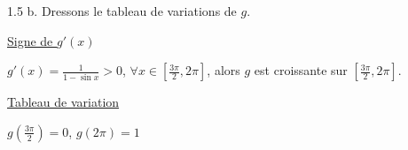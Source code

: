 \documentclass[12pt]{article}
\begin{document}
\begin{spacing}{1.5}
b. Dressons le tableau de variations de $g$.

\underline{Signe de $g'(x)$}

$g'(x)=\frac{1}{1-\sin x}>0$, $\forall x\in [\frac{3\pi}{2},2\pi]$, alors $g$ est croissante sur $[\frac{3\pi}{2},2\pi]$.

\underline{Tableau de variation}

$g(\frac{3\pi}{2})=0$, $g(2\pi)=1$

\begin{center}
\end{center}

\end{spacing}
\end{document}

